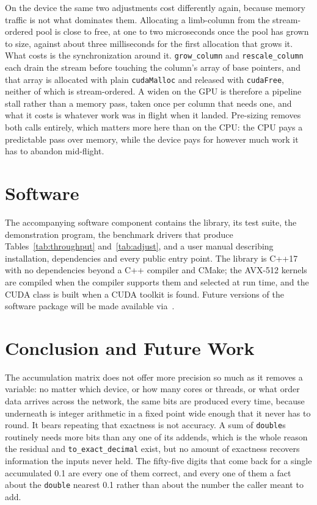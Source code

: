 \documentclass[acmsmall,screen,review]{acmart}
\newcommand{\code}[1]{\texttt{#1}}
\begin{document}
On the device the same two adjustments cost differently again, because memory traffic is not what dominates them. Allocating a limb-column from the stream-ordered pool is close to free, at one to two microseconds once the pool has grown to size, against about three milliseconds for the first allocation that grows it. What costs is the synchronization around it. \code{grow\_column} and \code{rescale\_column} each drain the stream before touching the column's array of base pointers, and that array is allocated with plain \code{cudaMalloc} and released with \code{cudaFree}, neither of which is stream-ordered. A widen on the GPU is therefore a pipeline stall rather than a memory pass, taken once per column that needs one, and what it costs is whatever work was in flight when it landed. Pre-sizing removes both calls entirely, which matters more here than on the CPU: the CPU pays a predictable pass over memory, while the device pays for however much work it has to abandon mid-flight.

\section{Software}

The accompanying software component contains the library, its test suite, the demonstration program, the benchmark drivers that produce Tables~\ref{tab:throughput} and~\ref{tab:adjust}, and a user manual describing installation, dependencies and every public entry point. The library is C++17 with no dependencies beyond a C++ compiler and CMake; the AVX-512 kernels are compiled when the compiler supports them and selected at run time, and the CUDA class is built when a CUDA toolkit is found. Future versions of the software package will be made available via~\cite{truesumrepo}.

\section{Conclusion and Future Work}

The accumulation matrix does not offer more precision so much as it removes a variable: no matter which device, or how many cores or threads, or what order data arrives across the network, the same bits are produced every time, because underneath is integer arithmetic in a fixed point wide enough that it never has to round. It bears repeating that exactness is not accuracy. A sum of \code{double}s routinely needs more bits than any one of its addends, which is the whole reason the residual and \code{to\_exact\_decimal} exist, but no amount of exactness recovers information the inputs never held. The fifty-five digits that come back for a single accumulated 0.1 are every one of them correct, and every one of them a fact about the \code{double} nearest 0.1 rather than about the number the caller meant to add.
\end{document}
